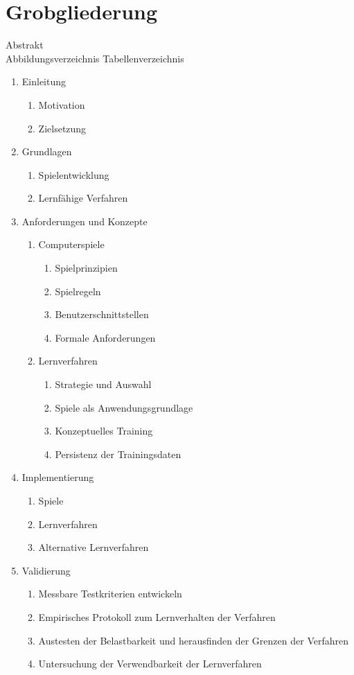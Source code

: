 \documentclass[12pt,a4paper]{scrartcl}
\begin{document}
\section*{Grobgliederung}
Abstrakt\\
Abbildungsverzeichnis
Tabellenverzeichnis
\begin{enumerate}
	\item Einleitung
	\begin{enumerate}
		\item Motivation
		\item Zielsetzung
	\end{enumerate}
	
	\item Grundlagen
	\begin{enumerate}
		\item Spielentwicklung
		\item Lernfähige Verfahren
	\end{enumerate}

	\item Anforderungen und Konzepte
	\begin{enumerate}
		\item Computerspiele
		\begin{enumerate}
			\item Spielprinzipien
			\item Spielregeln
			\item Benutzerschnittstellen
			\item Formale Anforderungen
		\end{enumerate}
		\item Lernverfahren
		\begin{enumerate}
			\item Strategie und Auswahl
			\item Spiele als Anwendungsgrundlage
			\item Konzeptuelles Training
			\item Persistenz der Trainingsdaten
		\end{enumerate}
	\end{enumerate}		
	
	\item Implementierung
	\begin{enumerate}
		\item Spiele
		\item Lernverfahren
		\item Alternative Lernverfahren
	\end{enumerate}
	
	\item Validierung
	\begin{enumerate}
		\item Messbare Testkriterien entwickeln
		\item Empirisches Protokoll zum Lernverhalten der Verfahren
		\item Austesten der Belastbarkeit und herausfinden der Grenzen der Verfahren
		\item Untersuchung der Verwendbarkeit der Lernverfahren 
	\end{enumerate}
	

\end{enumerate}
\end{document}
